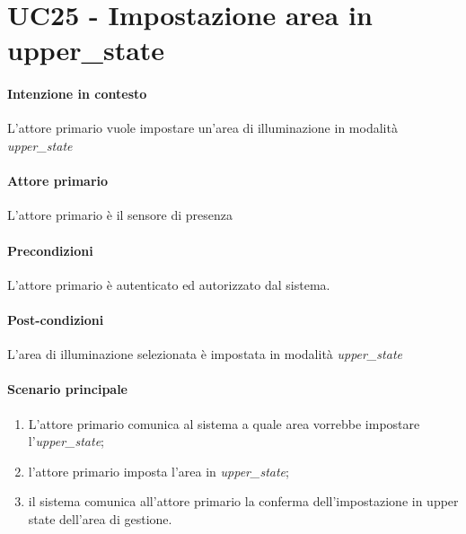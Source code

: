 \section{UC25 - Impostazione area in upper\_state}\label{uc:25}
\paragraph{Intenzione in contesto} L'attore primario vuole impostare un'area di illuminazione in modalità \textit{upper\_state}
\paragraph{Attore primario} L'attore primario è il sensore di presenza
\paragraph{Precondizioni} L'attore primario è autenticato ed autorizzato dal sistema.
\paragraph{Post-condizioni} L'area di illuminazione selezionata è impostata in modalità \textit{upper\_state}
\paragraph{Scenario principale}
\begin{enumerate}
    \item L'attore primario comunica al sistema a quale area vorrebbe impostare l'\textit{upper\_state};
    \item l'attore primario imposta l'area in \textit{upper\_state};
    \item il sistema comunica all'attore primario la conferma dell'impostazione in upper state dell'area di gestione.
\end{enumerate}